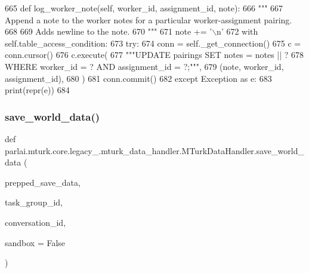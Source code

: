 \begin{DoxyCode}
665     \textcolor{keyword}{def }log\_worker\_note(self, worker\_id, assignment\_id, note):
666         \textcolor{stringliteral}{"""}
667 \textcolor{stringliteral}{        Append a note to the worker notes for a particular worker-assignment pairing.}
668 \textcolor{stringliteral}{}
669 \textcolor{stringliteral}{        Adds newline to the note.}
670 \textcolor{stringliteral}{        """}
671         note += \textcolor{stringliteral}{'\(\backslash\)n'}
672         with self.table\_access\_condition:
673             \textcolor{keywordflow}{try}:
674                 conn = self.\_get\_connection()
675                 c = conn.cursor()
676                 c.execute(
677                     \textcolor{stringliteral}{"""UPDATE pairings SET notes = notes || ?}
678 \textcolor{stringliteral}{                             WHERE worker\_id = ? AND assignment\_id = ?;"""},
679                     (note, worker\_id, assignment\_id),
680                 )
681                 conn.commit()
682             \textcolor{keywordflow}{except} Exception \textcolor{keyword}{as} e:
683                 print(repr(e))
684 
\end{DoxyCode}
\mbox{\label{classparlai_1_1mturk_1_1core_1_1legacy__2018_1_1mturk__data__handler_1_1MTurkDataHandler_a823e69b5a768d557ec581c376751681d}} 
\subsubsection{\texorpdfstring{save\+\_\+world\+\_\+data()}{save\_world\_data()}}
{\footnotesize\ttfamily def parlai.\+mturk.\+core.\+legacy\+\_.\+mturk\+\_\+data\+\_\+handler.\+M\+Turk\+Data\+Handler.\+save\+\_\+world\+\_\+data (\begin{DoxyParamCaption}\item[{}]{prepped\+\_\+save\+\_\+data,  }\item[{}]{task\+\_\+group\+\_\+id,  }\item[{}]{conversation\+\_\+id,  }\item[{}]{sandbox = {\ttfamily False} }\end{DoxyParamCaption})\hspace{0.3cm}{\ttfamily [static]}}



